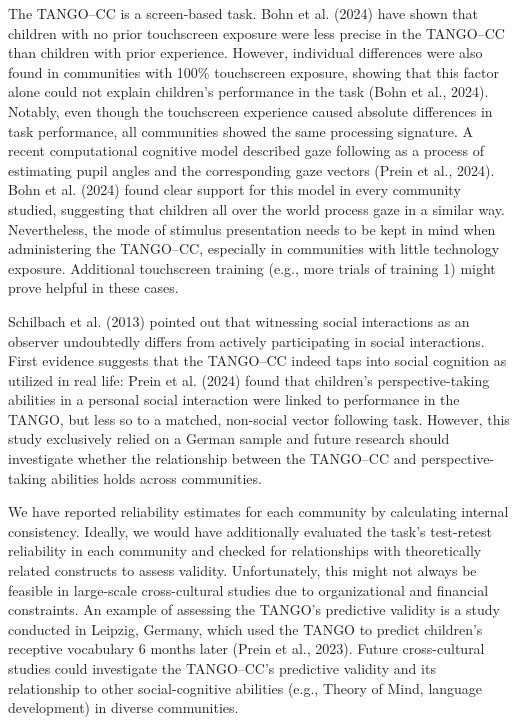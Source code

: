 \documentclass[
  man,floatsintext]{apa7}
\begin{document}
The TANGO--CC is a screen-based task.
Bohn et al. (2024) have shown that children with no prior touchscreen exposure were less precise in the TANGO--CC than children with prior experience.
However, individual differences were also found in communities with 100\% touchscreen exposure, showing that this factor alone could not explain children's performance in the task (Bohn et al., 2024).
Notably, even though the touchscreen experience caused absolute differences in task performance, all communities showed the same processing signature.
A recent computational cognitive model described gaze following as a process of estimating pupil angles and the corresponding gaze vectors (Prein et al., 2024).
Bohn et al. (2024) found clear support for this model in every community studied, suggesting that children all over the world process gaze in a similar way.
Nevertheless, the mode of stimulus presentation needs to be kept in mind when administering the TANGO--CC, especially in communities with little technology exposure.
Additional touchscreen training (e.g., more trials of training 1) might prove helpful in these cases.

Schilbach et al. (2013) pointed out that witnessing social interactions as an observer undoubtedly differs from actively participating in social interactions.
First evidence suggests that the TANGO--CC indeed taps into social cognition as utilized in real life: Prein et al. (2024) found that children's perspective-taking abilities in a personal social interaction were linked to performance in the TANGO, but less so to a matched, non-social vector following task.
However, this study exclusively relied on a German sample and future research should investigate whether the relationship between the TANGO--CC and perspective-taking abilities holds across communities.

We have reported reliability estimates for each community by calculating internal consistency.
Ideally, we would have additionally evaluated the task's test-retest reliability in each community and checked for relationships with theoretically related constructs to assess validity.
Unfortunately, this might not always be feasible in large-scale cross-cultural studies due to organizational and financial constraints.
An example of assessing the TANGO's predictive validity is a study conducted in Leipzig, Germany, which used the TANGO to predict children's receptive vocabulary 6 months later (Prein et al., 2023).
Future cross-cultural studies could investigate the TANGO--CC's predictive validity and its relationship to other social-cognitive abilities (e.g., Theory of Mind, language development) in diverse communities.
\end{document}
